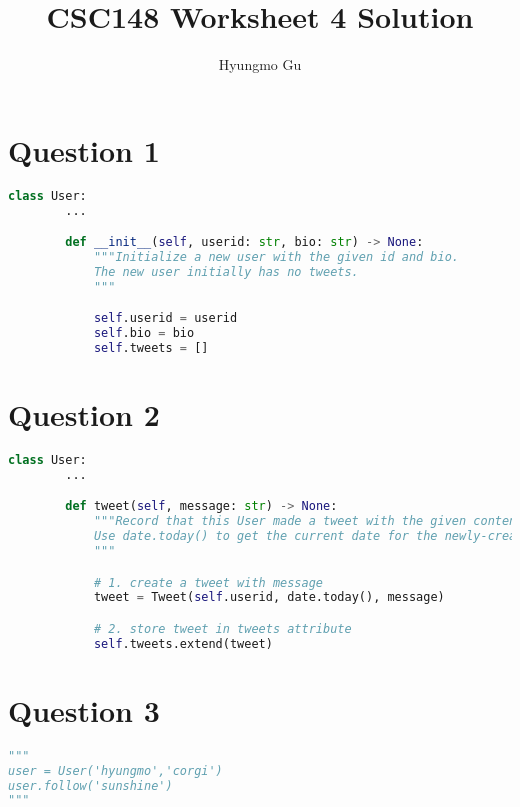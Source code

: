 \documentclass[12pt]{article}
\begin{document}
\title{CSC148 Worksheet 4 Solution}
\author{Hyungmo Gu}
\maketitle

\section*{Question 1}
\begin{lstlisting}[language=Python]
    class User:
        ...

        def __init__(self, userid: str, bio: str) -> None:
            """Initialize a new user with the given id and bio.
            The new user initially has no tweets.
            """

            self.userid = userid
            self.bio = bio
            self.tweets = []

\end{lstlisting}


\section*{Question 2}

\begin{lstlisting}[language=Python]
    class User:
        ...

        def tweet(self, message: str) -> None:
            """Record that this User made a tweet with the given content.
            Use date.today() to get the current date for the newly-created tweet.
            """

            # 1. create a tweet with message
            tweet = Tweet(self.userid, date.today(), message)

            # 2. store tweet in tweets attribute
            self.tweets.extend(tweet)

\end{lstlisting}

\section*{Question 3}

\begin{lstlisting}[language=Python]
"""
user = User('hyungmo','corgi')
user.follow('sunshine')
"""
\end{lstlisting}
\end{document}
